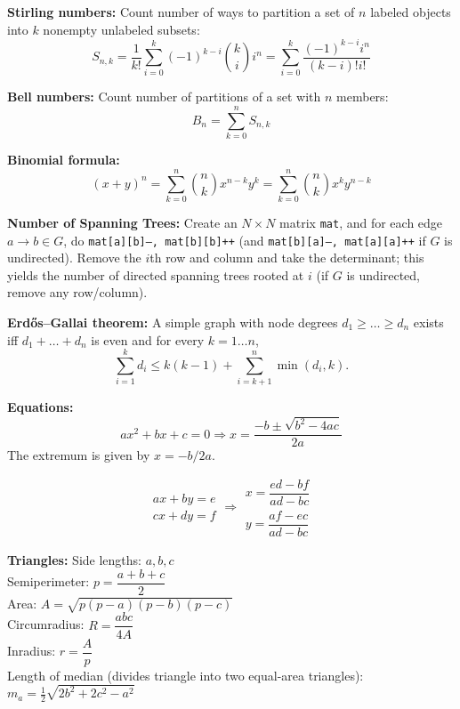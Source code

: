 \noindent
\textbf{Stirling numbers:}
\noindent
Count number of ways to partition a set of $n$ labeled objects into $k$ nonempty unlabeled subsets:
\[ S_{n,k}= \frac{1}{k!} \sum_{i=0}^{k}(-1)^{k-i}\binom{k}{i} i^n =  \sum_{i=0}^{k}\frac{(-1)^{k-i} i^n}{(k-i)!i!} \]

\noindent
\textbf{Bell numbers:}
\noindent
Count number of partitions of a set with $n$ members:
\[ B_n = \sum_{k=0}^{n} S_{n,k} \]

\noindent
\textbf{Binomial formula:}
\[ (x+y)^n = \sum_{k=0}^{n} \binom{n}{k} x^{n-k}y^{k} = \sum_{k=0}^{n} \binom{n}{k} x^{k}y^{n-k}\]

\noindent
\textbf{Number of Spanning Trees:}
\noindent
Create an $N\times N$ matrix \texttt{mat}, and for each edge $a \rightarrow b \in G$, do
\texttt{mat[a][b]--, mat[b][b]++} (and \texttt{mat[b][a]--, mat[a][a]++} if $G$ is undirected).
Remove the $i$th row and column and take the determinant; this yields the number of directed spanning trees rooted at $i$
(if $G$ is undirected, remove any row/column).

\noindent
\textbf{Erdős–Gallai theorem:}
\noindent
A simple graph with node degrees $d_1 \ge \dots \ge d_n$ exists iff $d_1 + \dots + d_n$ is even and for every $k = 1\dots n$,
\[ \sum _{i=1}^{k}d_{i}\leq k(k-1)+\sum _{i=k+1}^{n}\min(d_{i},k). \]

\noindent
\textbf{Equations:}
\[ax^2+bx+c=0 \Rightarrow x = \frac{-b\pm\sqrt{b^2-4ac}}{2a}\]
\noindent
The extremum is given by $x = -b/2a$.

\[\begin{aligned}ax+by=e\\cx+dy=f\end{aligned}
\Rightarrow
\begin{aligned}x=\dfrac{ed-bf}{ad-bc}\\y=\dfrac{af-ec}{ad-bc}\end{aligned}\]

\noindent
\textbf{Triangles:}
\noindent
Side lengths: $a,b,c$\\
Semiperimeter: $p=\dfrac{a+b+c}{2}$\\
Area: $A=\sqrt{p(p-a)(p-b)(p-c)}$\\
Circumradius: $R=\dfrac{abc}{4A}$\\
Inradius: $r=\dfrac{A}{p}$\\
Length of median (divides triangle into two equal-area triangles): $m_a=\tfrac{1}{2}\sqrt{2b^2+2c^2-a^2}$\\

